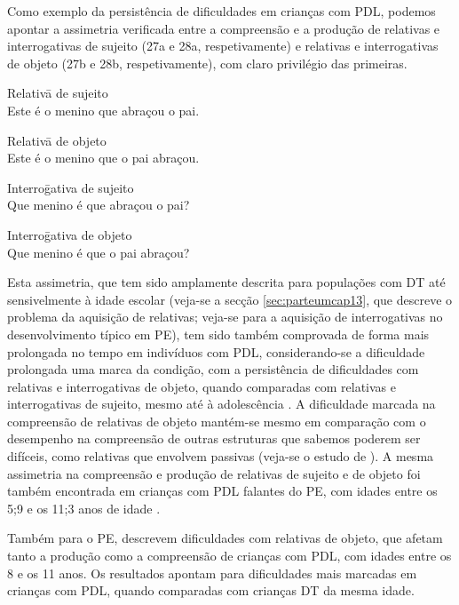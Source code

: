 \documentclass[output=paper,colorlinks,citecolor=brown,booklanguage=portuguese]{langscibook}
\begin{document}
Como exemplo da persistência de dificuldades em crianças com PDL, podemos apontar a assimetria verificada entre a compreensão e a produção de relativas e interrogativas de sujeito (27a e 28a, respetivamente) e relativas e interrogativas de objeto (27b e 28b, respetivamente), com claro privilégio das primeiras.  

\ea
    \label{ex:13:27}
\ea \begin{tabbing}Relativ\=a de sujeito\\
               \>Este é o menino que abraçou o pai.\end{tabbing}
\ex \begin{tabbing} Relativ\=a de objeto\\
                \>Este é o menino que o pai abraçou. \end{tabbing}
                \z
                \z
\ea
    \label{ex:13:28}
    \ea \begin{tabbing}Interro\=gativa de sujeito\\
               \>Que menino é que abraçou o pai?\end{tabbing}
\ex \begin{tabbing}Interro\=gativa de objeto\\
\>Que menino é que o pai abraçou?  \end{tabbing}  
\z
\z

Esta assimetria, que tem sido amplamente descrita para populações com DT até sensivelmente à idade escolar (veja-se a secção \ref{sec:parteumcap13}, que descreve o problema da aquisição de relativas; veja-se \citealp{Cerejeira2009} para a aquisição de interrogativas no desenvolvimento típico em PE), tem sido também comprovada de forma mais prolongada no tempo em indivíduos com PDL, considerando-se a dificuldade prolongada uma marca da condição, com a persistência de dificuldades com relativas e interrogativas de objeto, quando comparadas com relativas e interrogativas de sujeito, mesmo até à adolescência \citep{Friedmann2004, Friedmann2011}. A dificuldade marcada na compreensão de relativas de objeto mantém-se mesmo em comparação com o desempenho na compreensão de outras estruturas que sabemos poderem ser difíceis, como relativas que envolvem passivas (veja-se o estudo de \citealp{Arosio2017}). A mesma assimetria na compreensão e produção de relativas de sujeito e de objeto foi também encontrada em crianças com PDL falantes do PE, com idades entre os 5;9 e os 11;3 anos de idade \citep{Costa2009, Ferreira2008}.  

Também para o PE, \citet{Martins2017a} descrevem dificuldades com relativas de objeto, que afetam tanto a produção como a compreensão de crianças com PDL, com idades entre os 8 e os 11 anos. Os resultados apontam para dificuldades mais marcadas em crianças com PDL, quando comparadas com crianças DT da mesma idade. 
\end{document}
